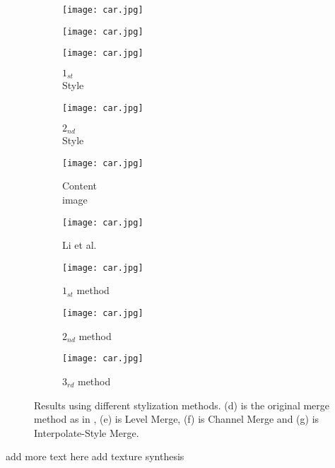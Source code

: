 \begin{figure}[h!]
\begin{subfigure}[b]{0.13\linewidth}
	\end{subfigure}
	\begin{subfigure}[b]{0.13\linewidth}
		\texttt{[image: car.jpg]} %
	\end{subfigure}
	\begin{subfigure}[b]{0.13\linewidth}
		\texttt{[image: car.jpg]} %
	\end{subfigure}
	\centering
	\begin{subfigure}[b]{0.13\linewidth}
		\texttt{[image: car.jpg]} %
		\caption{$1_{st}$ \\ Style}
	\end{subfigure}
	\begin{subfigure}[b]{0.13\linewidth}
		\texttt{[image: car.jpg]} %
		\caption{$2_{nd}$ \\ Style}
	\end{subfigure}
	\begin{subfigure}[b]{0.13\linewidth}
		\texttt{[image: car.jpg]} %
		\caption{Content \\ image}
	\end{subfigure}
	\begin{subfigure}[b]{0.13\linewidth}
		\texttt{[image: car.jpg]} %
		\caption{Li et al. \cite{bib11}}
	\end{subfigure}
	\begin{subfigure}[b]{0.13\linewidth}
		\texttt{[image: car.jpg]} %
		\caption{$1_{st}$ method}
	\end{subfigure}
	\begin{subfigure}[b]{0.13\linewidth}
		\texttt{[image: car.jpg]} %
		\caption{$2_{nd}$ method}
	\end{subfigure}
	\begin{subfigure}[b]{0.13\linewidth}
		\texttt{[image: car.jpg]} %
		\caption{$3_{rd}$ method}
	\end{subfigure}
		\caption{Results using different stylization methods. (d) is the original merge method as in \cite{bib11}, (e) is Level Merge, (f) is Channel Merge and (g) is Interpolate-Style Merge.}
		\label{fig:Merge}
\end{figure}
add more text here
add texture synthesis 